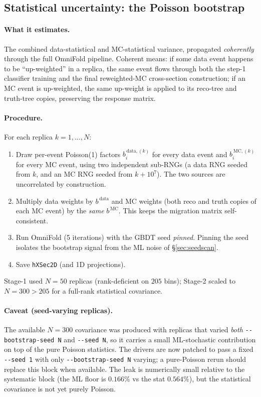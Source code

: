 \documentclass[12pt]{article}
\begin{document}
\subsection{Statistical uncertainty: the Poisson bootstrap}
\label{sec:bootstrap}

\paragraph{What it estimates.}
The combined data-statistical and MC-statistical variance, propagated
\emph{coherently} through the full OmniFold pipeline. Coherent means:
if some data event happens to be ``up-weighted'' in a replica, the
same event flows through both the step-1 classifier training and the
final reweighted-MC cross-section construction; if an MC event is
up-weighted, the same up-weight is applied to its reco-tree and
truth-tree copies, preserving the response matrix.

\paragraph{Procedure.}
For each replica $k=1,\dots,N$:
\begin{enumerate}[nosep]
  \item Draw per-event Poisson(1) factors $b_{i}^{\,\text{data},(k)}$
        for every data event and $b_{i}^{\,\text{MC},(k)}$ for every
        MC event, using two independent sub-RNGs (a data RNG seeded
        from $k$, and an MC RNG seeded from $k + 10^{7}$). The two
        sources are uncorrelated by construction.
  \item Multiply data weights by $b^{\,\text{data}}$ and MC weights
        (both reco and truth copies of each MC event) by the
        \emph{same} $b^{\,\text{MC}}$. This keeps the migration
        matrix self-consistent.
  \item Run OmniFold (5 iterations) with the GBDT seed \emph{pinned}.
        Pinning the seed isolates the bootstrap signal from the ML
        noise of \S\ref{sec:seedscan}.
  \item Save \texttt{hXSec2D} (and 1D projections).
\end{enumerate}
Stage-1 used $N=50$ replicas (rank-deficient on $205$ bins); Stage-2
scaled to $N=300 > 205$ for a full-rank statistical covariance.

\paragraph{Caveat (seed-varying replicas).}
The available $N=300$ covariance was produced with replicas that
varied \emph{both} \texttt{-{}-bootstrap-seed N} and \texttt{-{}-seed N},
so it carries a small ML-stochastic contribution on top of the pure
Poisson statistics. The drivers are now patched to pass a fixed
\texttt{-{}-seed 1} with only \texttt{-{}-bootstrap-seed N} varying;
a pure-Poisson rerun should replace this block when available. The
leak is numerically small relative to the systematic block (the ML
floor is $0.166\%$ vs the stat $0.564\%$), but the statistical
covariance is not yet purely Poisson.
\end{document}
